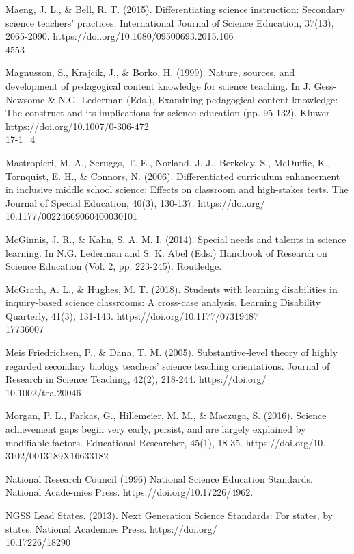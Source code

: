 \documentclass[11.5pt]{sig-alternate}
\begin{document}
\begin{large}
Maeng, J. L., \& Bell, R. T. (2015). Differentiating science instruction: Secondary science teachers’ practices. International Journal of Science Education, 37(13), 2065-2090. https://doi.org/10.1080/09500693.2015.106\\4553

Magnusson, S., Krajcik, J., \& Borko, H. (1999). Nature, sources, and development of pedagogical content knowledge for science teaching. In J. Gess-Newsome \& N.G. Lederman (Eds.), Examining pedagogical content knowledge: The construct and its implications for science education (pp. 95-132). Kluwer. https://doi.org/10.1007/0-306-472\\17-1\_4

Mastropieri, M. A., Scruggs, T. E., Norland, J. J., Berkeley, S., McDuffie, K., Tornquist, E. H., \& Connors, N. (2006). Differentiated curriculum enhancement in inclusive middle school science: Effects on classroom and high-stakes tests. The Journal of Special Education, 40(3), 130-137. https://doi.org/\\10.1177/00224669060400030101

McGinnis, J. R., \& Kahn, S. A. M. I. (2014). Special needs and talents in science learning. In N.G. Lederman and S. K. Abel (Eds.) Handbook of Research on Science Education (Vol. 2, pp. 223-245). Routledge.

McGrath, A. L., \& Hughes, M. T. (2018). Students with learning disabilities in inquiry-based science classrooms: A cross-case analysis. Learning Disability Quarterly, 41(3), 131-143. https://doi.org/10.1177/07319487\\17736007

Meis Friedrichsen, P., \& Dana, T. M. (2005). Substantive‐level theory of highly regarded secondary biology teachers' science teaching orientations. Journal of Research in Science Teaching, 42(2), 218-244. https://doi.org/\\10.1002/tea.20046

Morgan, P. L., Farkas, G., Hillemeier, M. M., \& Maczuga, S. (2016). Science achievement gaps begin very early, persist, and are largely explained by modifiable factors. Educational Researcher, 45(1), 18-35. https://doi.org/10.\\3102/0013189X16633182

National Research Council (1996) National Science Education Standards. National Acade-mies Press. https://doi.org/10.17226/4962.

NGSS Lead States. (2013). Next Generation Science Standards: For states, by states. National Academies Press. https://doi.org/\\10.17226/18290


\end{large}
\end{document}
